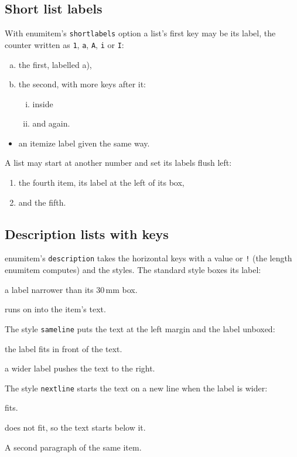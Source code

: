 \documentclass{article}
\numberwithin{equation}{section}
\theoremstyle{definition}
\theoremstyle{remark}
\begin{document}
\subsection{Short list labels}\label{sec:shortlabels}
With enumitem's \texttt{shortlabels} option a list's first key may be its label, the
counter written as \texttt{1}, \texttt{a}, \texttt{A}, \texttt{i} or \texttt{I}:
\begin{enumerate}[a)]
\item the first, labelled a),
\item the second, with more keys after it:
  \begin{enumerate}[(i), noitemsep]
  \item inside
  \item and again.
  \end{enumerate}
\end{enumerate}
\begin{itemize}[--]
\item an itemize label given the same way.
\end{itemize}
A list may start at another number and set its labels flush left:
\begin{enumerate}[start=4, align=left]
\item the fourth item, its label at the left of its box,
\item and the fifth.
\end{enumerate}

\subsection{Description lists with keys}\label{sec:desckeys}
enumitem's \texttt{description} takes the horizontal keys with a value or \texttt{!} (the
length enumitem computes) and the styles. The standard style boxes its label:
\begin{description}[leftmargin=!,labelwidth=30mm]
  \item[Morgan, Alex] a label narrower than its 30\,mm box.
  \item[A label much wider than its box] runs on into the item's text.
\end{description}
The style \texttt{sameline} puts the text at the left margin and the label unboxed:
\begin{description}[leftmargin=2.6cm,style=sameline]
  \item[Calibration] the label fits in front of the text.
  \item[Protocol and review] a wider label pushes the text to the right.
\end{description}
The style \texttt{nextline} starts the text on a new line when the label is wider:
\begin{description}[leftmargin=3cm,style=nextline]
  \item[Viscosity] fits.
  \item[An extremely wide label] does not fit, so the text starts below it.

  A second paragraph of the same item.
\end{description}
\end{document}
